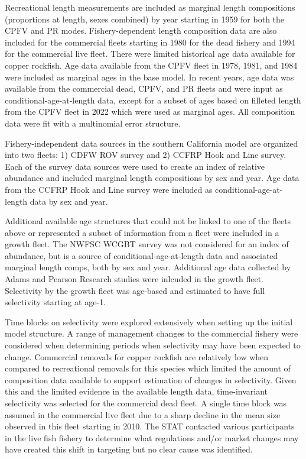 \documentclass[11pt,
  letterpaper,
]{article}
\begin{document}
Recreational length measurements are included as marginal length compositions (proportions at length, sexes combined) by year starting in 1959 for both the CPFV and PR modes. Fishery-dependent length composition data are also included for the commercial fleets starting in 1980 for the dead fishery and 1994 for the commercial live fleet. There were limited historical age data available for copper rockfish. Age data available from the CPFV fleet in 1978, 1981, and 1984 were included as marginal ages in the base model. In recent years, age data was available from the commercial dead, CPFV, and PR fleets and were input as conditional-age-at-length data, except for a subset of ages based on filleted length from the CPFV fleet in 2022 which were used as marginal ages. All composition data were fit with a multinomial error structure.

Fishery-independent data sources in the southern California model are organized into two fleets: 1) CDFW ROV survey and 2) CCFRP Hook and Line survey. Each of the survey data sources were used to create an index of relative abundance and included marginal length compositions by sex and year. Age data from the CCFRP Hook and Line survey were included as conditional-age-at-length data by sex and year.

Additional available age structures that could not be linked to one of the fleets above or represented a subset of information from a fleet were included in a growth fleet. The NWFSC WCGBT survey was not considered for an index of abundance, but is a source of conditional-age-at-length data and associated marginal length comps, both by sex and year. Additional age data collected by Adams and Pearson Research studies were inlcuded in the growth fleet. Selectivity by the growth fleet was age-based and estimated to have full selectivity starting at age-1.

Time blocks on selectivity were explored extensively when setting up the initial model structure. A range of management changes to the commercial fishery were considered when determining periods when selectivity may have been expected to change. Commercial removals for copper rockfish are relatively low when compared to recreational removals for this species which limited the amount of composition data available to support estimation of changes in selectivity. Given this and the limited evidence in the available length data, time-invariant selectivity was selected for the commercial dead fleet. A single time block was assumed in the commercial live fleet due to a sharp decline in the mean size observed in this fleet starting in 2010. The STAT contacted various participants in the live fish fishery to determine what regulations and/or market changes may have created this shift in targeting but no clear cause was identified.
\end{document}

